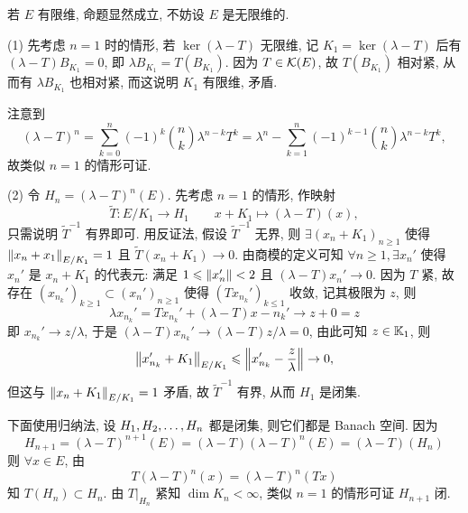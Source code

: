     \begin{Proof}
        若 $ E $ 有限维, 命题显然成立, 不妨设 $ E $ 是无限维的.

        (1) 先考虑 $ n=1 $ 时的情形, 若 $ \ker(\lambda-T) $ 无限维, 记 $ K_{1}=\ker(\lambda-T) $ 后有 $ (\lambda-T)B_{K_{1}}=0 $, 即 $ \lambda B_{K_{1}}=T(B_{K_{1}}) $. 因为 $ T\in\mathcal{K}(E) $, 故 $ T(B_{K_{1}}) $ 相对紧, 从而有 $ \lambda B_{K_{1}} $ 也相对紧, 而这说明 $ K_{1} $ 有限维, 矛盾.
        
        注意到 
        \[
            (\lambda-T)^{n}=\sum_{k=0}^{n}(-1)^{k}\binom{n}{k}\lambda^{n-k}T^{k} = \lambda^{n}-\sum_{k=1}^{n}(-1)^{k-1}\binom{n}{k}\lambda^{n-k}T^{k},
        \]
        故类似 $ n=1 $ 的情形可证.

        (2) 令 $ H_{n}= (\lambda-T)^{n}(E) $. 先考虑 $ n=1 $ 的情形, 作映射
        \[
            \tilde{T}: E/K_{1}\to H_{1}\qquad x+K_{1}\mapsto (\lambda-T)(x),
        \]
        只需说明 $ \tilde{T}^{-1} $ 有界即可. 用反证法, 假设 $ \tilde{T}^{-1} $ 无界, 则 $ \exists (x_{n}+K_{1})_{n\geqslant1} $ 使得 $ \left\| x_{n}+x_{1} \right\|_{E/K_{1}}=1 $ 且 $ \tilde{T}(x_{n}+K_{1})\to 0 $. 由商模的定义可知 $ \forall n\geqslant1, \exists x_{n}' $ 使得  $ x_{n}' $ 是 $ x_{n}+K_{1} $ 的代表元: 满足 $ 1\leqslant\left\| x_{n}' \right\|<2 $ 且 $ (\lambda-T)x_{n}'\to 0 $. 因为 $ T $ 紧, 故存在 $ (x_{n_{k}}')_{k\geqslant1}\subset(x_{n}')_{n\geqslant1} $ 使得 $ (Tx_{n_{k}}')_{k\leqslant1} $ 收敛, 记其极限为 $ z $, 则
        \[
            \lambda x_{n_{k}}'=Tx_{n_{k}}'+(\lambda-T)x-{n_{k}}'\to z+0=z
        \]
        即 $ x_{n_{k}}'\to z/\lambda $, 于是 $ (\lambda-T)x_{n_{k}}'\to (\lambda-T)z/\lambda=0 $, 由此可知 $ z\in\mathbb{K}_{1} $, 则
        \[
            \left\| x_{n_{k}}'+K_{1} \right\|_{E/K_{1}}\leqslant\left\| x_{n_{k}}'-\frac{z}{\lambda} \right\|\to 0,
        \]
        但这与 $ \left\| x_{n}+K_{1} \right\|_{E/K_{1}}=1 $ 矛盾, 故 $ \tilde{T}^{-1} $ 有界, 从而 $ H_{1} $ 是闭集.

        下面使用归纳法, 设 $ H_{1}, H_{2}, \dots, H_{n} $ 都是闭集, 则它们都是 Banach 空间. 因为
        \[
            H_{n+1}=(\lambda-T)^{n+1}(E)=(\lambda-T)(\lambda-T)^{n}(E)=(\lambda-T)(H_{n})
        \]
        则 $ \forall x\in E $, 由
        \[
            T(\lambda-T)^{n}(x)=(\lambda-T)^{n}(Tx)
        \]
        知 $ T(H_{n})\subset H_{n} $. 由 $ T|_{H_{n}} $ 紧知 $ \dim K_{n}<\infty $, 类似 $ n=1 $ 的情形可证 $ H_{n+1} $ 闭.


\end{Proof}
